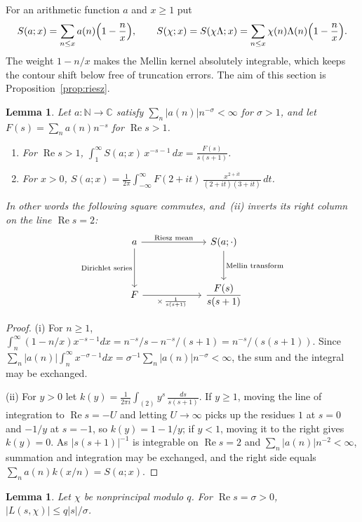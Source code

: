 \documentclass{aomart}
\numberwithin{equation}{section}
\newtheorem{lemma}[theorem]{Lemma}
\theoremstyle{definition}
\renewcommand{\Re}{\operatorname{Re}}
\newcommand{\C}{\mathbb{C}}
\begin{document}
For an arithmetic function $a$ and $x\ge1$ put
\[
  S(a;x)=\sum_{n\le x}a(n)\Bigl(1-\frac nx\Bigr),\qquad
  S(\chi;x)=S(\chi\Lambda;x)=\sum_{n\le x}\chi(n)\Lambda(n)\Bigl(1-\frac nx\Bigr).
\]
The weight $1-n/x$ makes the Mellin kernel absolutely integrable, which keeps the contour shift
below free of truncation errors. The aim of this section is Proposition~\ref{prop:riesz}.

\begin{lemma}\label{lem:mellin}
Let $a\colon\mathbb N\to\C$ satisfy $\sum_n|a(n)|n^{-\sigma}<\infty$ for $\sigma>1$, and let
$F(s)=\sum_na(n)n^{-s}$ for $\Re s>1$.
\begin{enumerate}
\item[(i)] For $\Re s>1$, $\displaystyle\int_1^\infty S(a;x)\,x^{-s-1}\,dx=\frac{F(s)}{s(s+1)}$.
\item[(ii)] For $x>0$, $\displaystyle S(a;x)=\frac1{2\pi}\int_{-\infty}^{\infty}
F(2+it)\,\frac{x^{2+it}}{(2+it)(3+it)}\,dt$.
\end{enumerate}
In other words the following square commutes, and~(ii) inverts its right column on the line
$\Re s=2$:
\[
\begin{tikzcd}[column sep=6em,row sep=3em]
a \arrow[r,"\text{Riesz mean}"] \arrow[d,"\text{Dirichlet series}"'] &
S(a;\cdot) \arrow[d,"\text{Mellin transform}"] \\
F \arrow[r,"\times\,\frac1{s(s+1)}"'] & \dfrac{F(s)}{s(s+1)}
\end{tikzcd}
\]
\end{lemma}

\begin{proof}
(i) For $n\ge1$, $\int_n^\infty(1-n/x)x^{-s-1}dx=n^{-s}/s-n^{-s}/(s+1)=n^{-s}/(s(s+1))$. Since
$\sum_n|a(n)|\int_n^\infty x^{-\sigma-1}dx=\sigma^{-1}\sum_n|a(n)|n^{-\sigma}<\infty$, the sum
and the integral may be exchanged.

(ii) For $y>0$ let $k(y)=\frac1{2\pi i}\int_{(2)}y^s\,\frac{ds}{s(s+1)}$. If $y\ge1$, moving the
line of integration to $\Re s=-U$ and letting $U\to\infty$ picks up the residues $1$ at $s=0$ and
$-1/y$ at $s=-1$, so $k(y)=1-1/y$; if $y<1$, moving it to the right gives $k(y)=0$. As
$|s(s+1)|^{-1}$ is integrable on $\Re s=2$ and $\sum_n|a(n)|n^{-2}<\infty$, summation and
integration may be exchanged, and the right side equals $\sum_na(n)k(x/n)=S(a;x)$.
\end{proof}

\begin{lemma}\label{lem:size}
Let $\chi$ be nonprincipal modulo $q$. For $\Re s=\sigma>0$, $|L(s,\chi)|\le q|s|/\sigma$.
\end{lemma}
\end{document}
